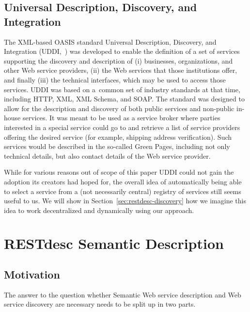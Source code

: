 \documentclass[smallextended]{svjour3}
\begin{document}
{\subsection{Universal Description, Discovery, and Integration} \label{sec:uddi}
The XML-based OASIS standard Universal Description, Discovery, and Integration (UDDI,~\cite{UDDI}) was developed to enable the definition of a set of services supporting the discovery and description of (i) businesses, organizations, and other Web service providers, (ii) the Web services that those institutions offer, and finally (iii) the technical interfaces, which may be used to access those services. UDDI was based on a~common set of industry standards at that time, including HTTP, XML, XML Schema, and SOAP. The standard was designed to allow for the description and discovery of both public services and non-public in-house services. It was meant to be used as a service broker where parties interested in a special service could go to and retrieve a list of service providers offering the desired service (for example, shipping address verification). Such services would be described in the so-called Green Pages, including not only technical details, but also contact details of the Web service provider.

While for various reasons out of scope of this paper UDDI could not gain the adoption its creators had hoped for, the overall idea of automatically being able to select a service from a (not necessarily central) registry of services still seems useful to us. We will show in Section~\ref{sec:restdesc-discovery} how we imagine this idea to work decentralized and dynamically using our approach.

\section{RESTdesc Semantic Description} \label{sec:restdesc-semantic-description}
\label{RESTdesc}

\subsection{Motivation}
The answer to the question whether Semantic Web service description and Web service discovery are necessary needs to be split up in two parts.

}
\end{document}
